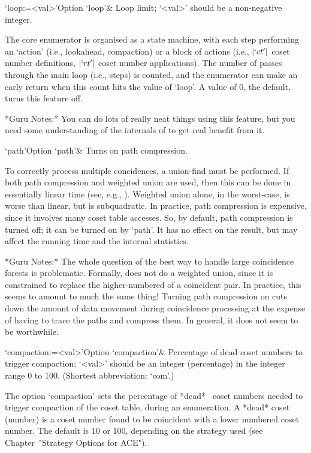 \>`loop:=<val>'{Option `loop'}&
Loop limit; `<val>' should be a non-negative integer.

The core enumerator is organised as a state machine,  with  each  step
performing an \lq{}action' (i.e., lookahead, compaction) or a block of
actions (i.e.,  $|`ct'|$  coset  number  definitions,  $|`rt'|$  coset
number applications). The number  of  passes  through  the  main  loop
(i.e., steps) is counted, and the enumerator can make an early  return
when this count hits the value of `loop'. A value of $0$, the default,
turns this feature off.

*Guru Notes:*
You can do lots of really neat things using this feature, but you need
some understanding of the internals of {\ACE} to get real benefit from
it.

\>`path'{Option `path'}&
Turns on path compression.

To correctly  process  multiple  concidences,  a  union-find  must  be
performed. If both path compression and weighted union are used,  then
this can be done in essentially linear time (see, e.g., \cite{CLR90}).
Weighted union alone, in the worst-case, is worse than linear, but  is
subquadratic. In practice, path compression  is  expensive,  since  it
involves many coset table accesses. So, by default,  path  compression
is turned off; it can be turned on by `path'. It has no effect on  the
result, but may affect the running time and the internal statistics.

*Guru Notes:*
The whole question of the best way to handle large coincidence forests
is problematic.  Formally, {\ACE} does  not do a weighted union, since
it is constrained to replace the higher-numbered of a coincident pair.
In practice,  this seems  to amount to  much the same  thing!  Turning
path  compression on  cuts down  the  amount of  data movement  during
coincidence processing at the expense of having to trace the paths and
compress them.  In general, it does not seem to be worthwhile.

\>`compaction:=<val>'{Option `compaction'}&
Percentage of dead coset numbers to trigger compaction;
`<val>' should be an integer (percentage) in the integer range 0 to 100.
(Shortest abbreviation: `com'.)

The option `compaction'  sets  the  percentage  of  *dead*~ coset numbers needed  to  trigger  compaction  of  the
coset table, during an enumeration. A *dead* coset (number) is a coset
number found to be coincident with a lower numbered coset number.  The
default  is  10  or  100,  depending  on  the   strategy   used   (see
Chapter~"Strategy Options for ACE").

